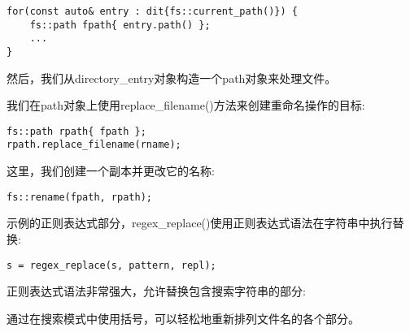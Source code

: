\begin{lstlisting}[style=styleCXX]
for(const auto& entry : dit{fs::current_path()}) {
	fs::path fpath{ entry.path() };
	...
}
\end{lstlisting}

然后，我们从directory\_entry对象构造一个path对象来处理文件。

我们在path对象上使用replace\_filename()方法来创建重命名操作的目标:

\begin{lstlisting}[style=styleCXX]
fs::path rpath{ fpath };
rpath.replace_filename(rname);
\end{lstlisting}

这里，我们创建一个副本并更改它的名称:

\begin{lstlisting}[style=styleCXX]
fs::rename(fpath, rpath);
\end{lstlisting}

示例的正则表达式部分，regex\_replace()使用正则表达式语法在字符串中执行替换:

\begin{lstlisting}[style=styleCXX]
s = regex_replace(s, pattern, repl);
\end{lstlisting}

正则表达式语法非常强大，允许替换包含搜索字符串的部分:


通过在搜索模式中使用括号，可以轻松地重新排列文件名的各个部分。



